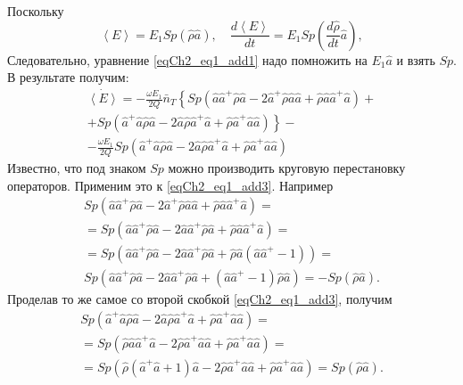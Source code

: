 Поскольку 
\begin{equation}
\left<E\right> = E_1 Sp\left(\hat{\rho}\hat{a}\right), \quad
\frac{d \left<E\right>}{d t} = E_1 Sp\left(\frac{d \hat{\rho}}{dt}\hat{a}\right),
\label{eqCh2_eq1_add2}
\end{equation}
Следовательно, уравнение \eqref{eqCh2_eq1_add1} 
надо помножить на $E_1 \hat{a}$ и взять $Sp$. В результате получим:
\begin{eqnarray}
\dot{\left<E\right>} =
- \frac{\omega E_1}{2Q}\bar{n}_T
\left\{Sp\left(\hat{a}\hat{a}^{+}\hat{\rho}\hat{a} - 
2 \hat{a}^{+}\hat{\rho}\hat{a}\hat{a} +
\hat{\rho}\hat{a}\hat{a}^{+}\hat{a}\right) + 
\right.
\nonumber \\
+\left.
Sp\left(\hat{a}^{+}\hat{a}\hat{\rho}\hat{a} - 
2 \hat{a}\hat{\rho}\hat{a}^{+}\hat{a}
+ \hat{\rho}\hat{a}^{+}\hat{a}\hat{a}
\right)
\right\}
- 
\nonumber \\
- \frac{\omega E_1}{2Q}
Sp\left(\hat{a}^{+}\hat{a}\hat{\rho}\hat{a} - 
2 \hat{a}\hat{\rho}\hat{a}^{+}\hat{a}
+ \hat{\rho}\hat{a}^{+}\hat{a}\hat{a}
\right)
\label{eqCh2_eq1_add3}
\end{eqnarray}
Известно, что под знаком $Sp$ можно производить круговую перестановку
операторов. Применим это к \eqref{eqCh2_eq1_add3}.
Например
\begin{eqnarray}
Sp\left(\hat{a}\hat{a}^{+}\hat{\rho}\hat{a} - 
2 \hat{a}^{+}\hat{\rho}\hat{a}\hat{a} +
\hat{\rho}\hat{a}\hat{a}^{+}\hat{a}\right) = 
\nonumber \\
= Sp\left(\hat{a}\hat{a}^{+}\hat{\rho}\hat{a} - 
2 \hat{a}\hat{a}^{+}\hat{\rho}\hat{a} +
\hat{\rho}\hat{a}\hat{a}^{+}\hat{a}\right) = 
\nonumber \\
= Sp\left(\hat{a}\hat{a}^{+}\hat{\rho}\hat{a} - 
2 \hat{a}\hat{a}^{+}\hat{\rho}\hat{a} +
\hat{\rho}\hat{a}\left(\hat{a}\hat{a}^{+} - 1\right)\right) = 
\nonumber \\
Sp\left(\hat{a}\hat{a}^{+}\hat{\rho}\hat{a} - 
2 \hat{a}\hat{a}^{+}\hat{\rho}\hat{a} +
\left(\hat{a}\hat{a}^{+} - 1\right)\hat{\rho}\hat{a}\right) = 
- Sp\left(\hat{\rho}\hat{a}\right).
\label{eqCh2_eq1_add4}
\end{eqnarray}
Проделав то же самое со второй скобкой \eqref{eqCh2_eq1_add3}, получим
\begin{eqnarray}
Sp\left(\hat{a}^{+}\hat{a}\hat{\rho}\hat{a} - 
2 \hat{a}\hat{\rho}\hat{a}^{+}\hat{a}
+ \hat{\rho}\hat{a}^{+}\hat{a}\hat{a} \right) = 
\nonumber \\
= 
Sp\left(\hat{\rho}\hat{a}\hat{a}^{+}\hat{a} - 
2 \hat{\rho}\hat{a}^{+}\hat{a}\hat{a}
+ \hat{\rho}\hat{a}^{+}\hat{a}\hat{a} \right) = 
\nonumber \\
= 
Sp\left(\hat{\rho}\left(\hat{a}^{+}\hat{a} + 1\right)\hat{a} - 
2 \hat{\rho}\hat{a}^{+}\hat{a}\hat{a}
+ \hat{\rho}\hat{a}^{+}\hat{a}\hat{a} \right) = 
Sp\left(\hat{\rho}\hat{a}\right).
\label{eqCh2_eq1_add5}
\end{eqnarray}
